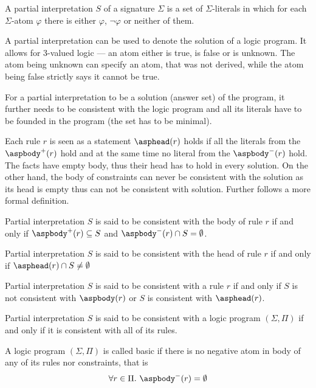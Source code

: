 \begin{definition}
    A partial interpretation $S$ of a signature $\Sigma$ is a set
    of $\Sigma$-literals in which for each $\Sigma$-atom $\varphi$
    there is either $\varphi$, $\neg\varphi$ or neither of them.
\end{definition}


A partial interpretation can be used to denote the solution of a logic program.
It allows for 3-valued logic --- an atom either is true, is false or is unknown.
The atom being unknown can specify an atom, that was not derived,
while the atom being false strictly says it cannot be true.

For a partial interpretation to be a solution (answer set) of the program,
it further needs to be consistent with the logic program
and all its literals have to be founded in the program (the set has to be minimal).

Each rule $r$ is seen as a statement $\asphead(r)$ holds
if all the literals from the $\aspbody^+(r)$ hold
and at the same time no literal from the $\aspbody^-(r)$ hold.
The facts have empty body, thus their head has to hold in every solution.
On the other hand, the body of constraints can never be consistent with
the solution as its head is empty thus can not be consistent with solution.
Further follows a more formal definition.

\begin{definition}\label{consistent_interpretation}
    Partial interpretation $S$ is said to be consistent with the body of rule $r$
    if and only if $\aspbody^+(r) \subseteq S$ and
    $\aspbody^-(r) \cap S = \emptyset$.

    Partial interpretation $S$ is said to be consistent with the head of rule $r$
    if and only if $\asphead(r) \cap S \neq \emptyset$

    Partial interpretation $S$ is said to be consistent with a rule $r$
    if and only if $S$ is not consistent with $\aspbody(r)$
    or $S$ is consistent with $\asphead(r)$.

    Partial interpretation $S$ is said to be consistent with a logic program
    $(\Sigma, \Pi)$ if and only if it is consistent with all of its rules.
\end{definition}

\begin{definition}%
    \label{def:basic_logic_program}
    A logic program $(\Sigma, \Pi)$ is called basic if there is no negative atom
    in body of any of its rules nor constraints, that is
    \begin{equation*}
        \forall r\in \Pi.\ \aspbody^{-}(r) = \emptyset
    \end{equation*}
\end{definition}

